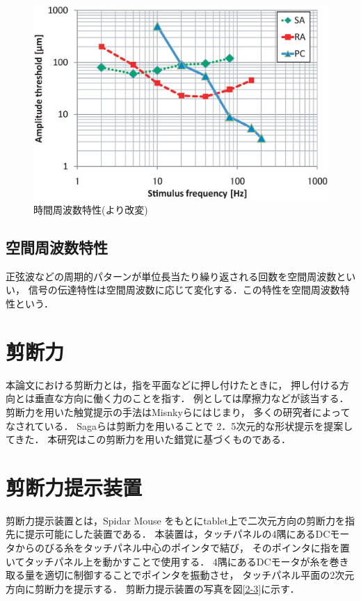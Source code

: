  \begin{figure}[h]
   \begin{center}
   \includegraphics[width=14cm]{SARAPC.eps}
   \caption{時間周波数特性(\cite{Freeman:1982:Response}より改変)}
   \label{2-2}
  \end{center}
\end{figure}

\subsection{空間周波数特性}
正弦波などの周期的パターンが単位長当たり繰り返される回数を空間周波数といい，
信号の伝達特性は空間周波数に応じて変化する．この特性を空間周波数特性という．

\newpage

\section{剪断力}
本論文における剪断力とは，指を平面などに押し付けたときに，
押し付ける方向とは垂直な方向に働く力のことを指す．
例としては摩擦力などが該当する．
剪断力を用いた触覚提示の手法はMisnkyら\cite{minsky1990feeling}にはじまり，
多くの研究者によってなされている．
Sagaら\cite{saga2012lateral}は剪断力を用いることで
2．5次元的な形状提示を提案してきた．
本研究はこの剪断力を用いた錯覚に基づくものである．

\section{剪断力提示装置}
剪断力提示装置とは，Spidar Mouse\cite{五十嵐達郎:2010:SPIDAR-mouseの提案}
をもとにtablet上で二次元方向の剪断力を指先に提示可能にした装置である．
本装置は，タッチパネルの4隅にあるDCモータからのびる糸をタッチパネル中心のポインタで結び，
そのポインタに指を置いてタッチパネル上を動かすことで使用する．
4隅にあるDCモータが糸を巻き取る量を適切に制御することでポインタを振動させ，
タッチパネル平面の2次元方向に剪断力を提示する．
剪断力提示装置の写真を図\ref{2-3}に示す．

